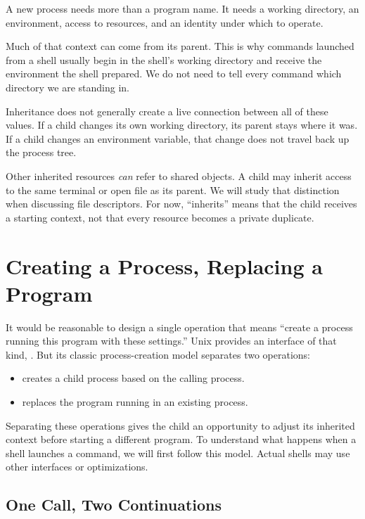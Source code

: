 \documentclass[11pt]{article}
\begin{document}
A new process needs more than a program name.
It needs a working directory, an environment, access to resources, and an identity under which to operate.

Much of that context can come from its parent.
This is why commands launched from a shell usually begin in the shell's working directory and receive the environment the shell prepared.
We do not need to tell every command which directory we are standing in.

Inheritance does not generally create a live connection between all of these values.
If a child changes its own working directory, its parent stays where it was.
If a child changes an environment variable, that change does not travel back up the process tree.

Other inherited resources \emph{can} refer to shared objects.
A child may inherit access to the same terminal or open file as its parent.
We will study that distinction when discussing file descriptors.
For now, ``inherits'' means that the child receives a starting context, not that every resource becomes a private duplicate.

\section{Creating a Process, Replacing a Program}

It would be reasonable to design a single operation that means ``create a process running this program with these settings.''
Unix provides an interface of that kind, .
But its classic process-creation model separates two operations:

\begin{itemize}
\item {} creates a child process based on the calling process.
\item {} replaces the program running in an existing process.
\end{itemize}

Separating these operations gives the child an opportunity to adjust its inherited context before starting a different program.
To understand what happens when a shell launches a command, we will first follow this model.
Actual shells may use other interfaces or optimizations.

\subsection{One Call, Two Continuations}
\end{document}
